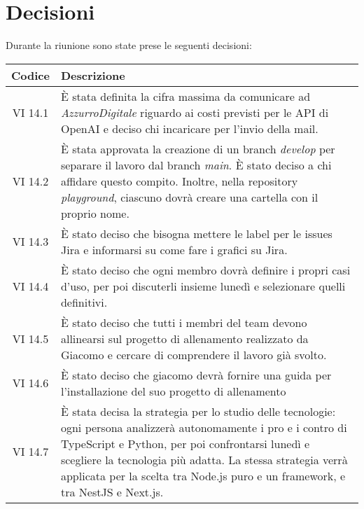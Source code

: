 
\section{Decisioni}

Durante la riunione sono state prese le seguenti decisioni:

\vspace{0.5cm}

\begin{table}[htbp]
    \centering
    \begin{tabular}{|c|p{}|}
        \hline
        \rowcolor[gray]{0.75}
        \textbf{Codice} & \textbf{Descrizione}\\
        \hline
        VI 14.1 & È stata definita la cifra massima da comunicare ad \emph{AzzurroDigitale} riguardo ai costi previsti per le API di OpenAI e deciso chi incaricare per l'invio della mail.\\
        \hline
        VI 14.2 & È stata approvata la creazione di un branch \emph{develop} per separare il lavoro dal branch \emph{main}. È stato deciso a chi affidare questo compito. Inoltre, nella repository \emph{playground}, ciascuno dovrà creare una cartella con il proprio nome.\\
        \hline
        VI 14.3 & È stato deciso che bisogna mettere le label per le issues Jira e informarsi su come fare i grafici su Jira.\\
        \hline
        VI 14.4 & È stato deciso che ogni membro dovrà definire i propri casi d'uso, per poi discuterli insieme lunedì e selezionare quelli definitivi.\\
        \hline
        VI 14.5 & È stato deciso che tutti i membri del team devono allinearsi sul progetto di allenamento realizzato da Giacomo e cercare di comprendere il lavoro già svolto.\\
        \hline
        VI 14.6 & È stato deciso che giacomo devrà fornire una guida per l'installazione del suo progetto di allenamento\\
        \hline
        VI 14.7 & È stata decisa la strategia per lo studio delle tecnologie: ogni persona analizzerà autonomamente i pro e i contro di TypeScript e Python, per poi confrontarsi lunedì e scegliere la tecnologia più adatta. La stessa strategia verrà applicata per la scelta tra Node.js puro e un framework, e tra NestJS e Next.js.\\

\end{tabular}
\end{table}
